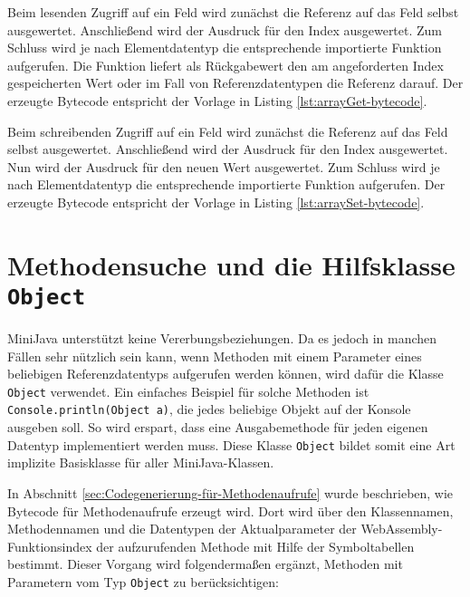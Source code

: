 Beim lesenden Zugriff auf ein Feld wird zunächst die Referenz auf das Feld selbst ausgewertet. Anschließend wird der Ausdruck für den Index ausgewertet. Zum Schluss wird je nach Elementdatentyp die entsprechende importierte Funktion aufgerufen. Die Funktion liefert als Rückgabewert den am angeforderten Index gespeicherten Wert oder im Fall von Referenzdatentypen die Referenz darauf. Der erzeugte Bytecode entspricht der Vorlage in Listing \ref{lst:arrayGet-bytecode}.



Beim schreibenden Zugriff auf ein Feld wird zunächst die Referenz auf das Feld selbst ausgewertet. Anschließend wird der Ausdruck für den Index ausgewertet. Nun wird der Ausdruck für den neuen Wert ausgewertet. Zum Schluss wird je nach Elementdatentyp die entsprechende importierte Funktion aufgerufen. Der erzeugte Bytecode entspricht der Vorlage in Listing \ref{lst:arraySet-bytecode}.



\section{Methodensuche und die Hilfsklasse \lstinline{Object}}

MiniJava unterstützt keine Vererbungsbeziehungen. Da es jedoch in manchen Fällen sehr nützlich sein kann, wenn Methoden mit einem Parameter eines beliebigen Referenzdatentyps aufgerufen werden können, wird dafür die Klasse \lstinline{Object} verwendet. Ein einfaches Beispiel für solche Methoden ist \lstinline{Console.println(Object a)}, die jedes beliebige Objekt auf der Konsole ausgeben soll. So wird erspart, dass eine Ausgabemethode für jeden eigenen Datentyp implementiert werden muss. Diese Klasse \lstinline{Object} bildet somit eine Art implizite Basisklasse für aller MiniJava-Klassen.

In Abschnitt \ref{sec:Codegenerierung-für-Methodenaufrufe} wurde beschrieben, wie Bytecode für Methodenaufrufe erzeugt wird. Dort wird über den Klassennamen, Methodennamen und die Datentypen der Aktualparameter der WebAssembly-Funktionsindex der aufzurufenden Methode mit Hilfe der Symboltabellen bestimmt. Dieser Vorgang wird folgendermaßen ergänzt, Methoden mit Parametern vom Typ \lstinline{Object} zu berücksichtigen:


